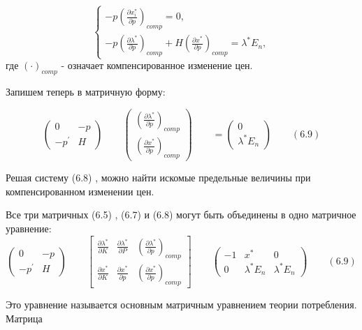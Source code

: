 \documentclass[12pt, 4paper]{book}
\begin{document}
{$$\left\{
\begin{aligned}
-p(\frac{\partial x_{i}^{*}}{\partial p})_{comp} = 0,\\
-p(\frac{\partial \lambda^{*}}{\partial p})_{comp}+H(\frac{\partial x^{*}}{\partial p})_{comp}=\lambda^{*}E_n,
\end{aligned}
\right.$$
где $(\cdot)_{comp}$ - означает компенсированное изменение цен.
\par

Запишем теперь в матричную форму: 


\[
\begin{pmatrix} 0 & -p \\ -p^{'} & H \end{pmatrix} \qquad
\begin{pmatrix} (\frac{\partial \lambda^{*}}{\partial p})_{comp} \\ (\frac{\partial x^{*}}{\partial p})_{comp} \end{pmatrix} \qquad =
\begin{pmatrix} 0  \\ \lambda^{*}E_n \end{pmatrix} \qquad (6.9)
\]

\par

Решая систему (6.8) , можно найти искомые предельные величины при компенсированном изменении цен. 
\par

Все три матричных (6.5) , (6.7) и (6.8) могут быть объединены в одно матричное уравнение: 
\[
\begin{pmatrix} 0 & -p \\ -p^{'} & H \end{pmatrix} \qquad
\begin{bmatrix} \frac{\partial \lambda^{*}}{\partial K} & \frac{\partial \lambda^{*}}{\partial P} & (\frac{\partial \lambda^{*}}{\partial p})_{comp} \\ \frac{\partial x^{*}}{\partial K} & \frac{\partial x^{*}}{\partial p} & (\frac{\partial x^{*}}{\partial p})_{comp} \end{bmatrix} \qquad
\begin{pmatrix} -1 & x^{*} & 0 \\ 0 & \lambda^{*}E_n & \lambda^{*}E_n \end{pmatrix} \qquad (6.9)
\]
\par

Это уравнение называется основным матричным уравнением теории потребления. Матрица 

}
\end{document}
